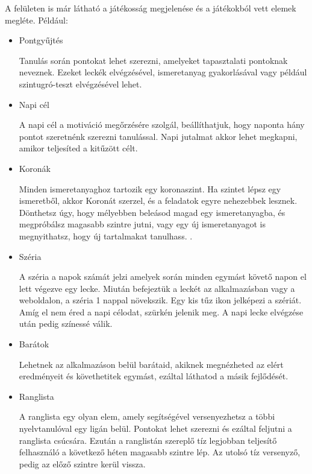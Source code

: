 A felületen is már látható a játékosság megjelenése és a játékokból vett elemek megléte. Például:
\begin{itemize}
  \item {Pontgyűjtés}
        \begin{addmargin}[\parindent]{0pt}
          Tanulás során pontokat lehet szerezni, amelyeket tapasztalati pontoknak neveznek. Ezeket leckék elvégzésével, ismeretanyag gyakorlásával vagy például szintugró-teszt elvégzésével lehet.
        \end{addmargin}
  \item Napi cél
        \begin{addmargin}[\parindent]{0pt}
          A napi cél a motiváció megőrzésére szolgál, beállíthatjuk, hogy naponta hány pontot szeretnénk szerezni tanulással. Napi jutalmat akkor lehet megkapni, amikor teljesíted a kitűzött célt.
        \end{addmargin}
  \item Koronák
        \begin{addmargin}[\parindent]{0pt}
          Minden ismeretanyaghoz tartozik egy koronaszint. Ha szintet lépsz egy ismeretből, akkor Koronát szerzel, és a feladatok egyre nehezebbek lesznek. Dönthetsz úgy, hogy mélyebben beleásod magad egy ismeretanyagba, és megpróbálsz magasabb szintre jutni, vagy egy új ismeretanyagot is megnyithatsz, hogy új tartalmakat tanulhass. \cite{koronaszintekDuolingo}.
        \end{addmargin}
  \item Széria
        \begin{addmargin}[\parindent]{0pt}
          A széria a napok számát jelzi amelyek során minden egymást követő napon el lett végezve egy lecke. Miután befejeztük a leckét az alkalmazásban vagy a weboldalon, a széria 1 nappal növekszik. Egy kis tűz ikon jelképezi a szériát. Amíg el nem éred a napi célodat, szürkén jelenik meg. A napi lecke elvégzése után pedig színessé válik. \cite{szeriaDuolingo}
        \end{addmargin}
  \item Barátok
        \begin{addmargin}[\parindent]{0pt}
          Lehetnek az alkalmazáson belül barátaid, akiknek megnézheted az elért eredményeit és követhetitek egymást, ezáltal láthatod a másik fejlődését.
        \end{addmargin}
  \item Ranglista
        \begin{addmargin}[\parindent]{0pt}
          A ranglista egy olyan elem, amely segítségével versenyezhetsz a többi nyelvtanulóval egy ligán belül. Pontokat lehet szerezni és ezáltal feljutni a ranglista csúcsára. Ezután a ranglistán szereplő tíz legjobban teljesítő felhasználó a következő héten magasabb szintre lép. Az utolsó tíz versenyző, pedig az előző szintre kerül vissza.
        \end{addmargin}
\end{itemize}

